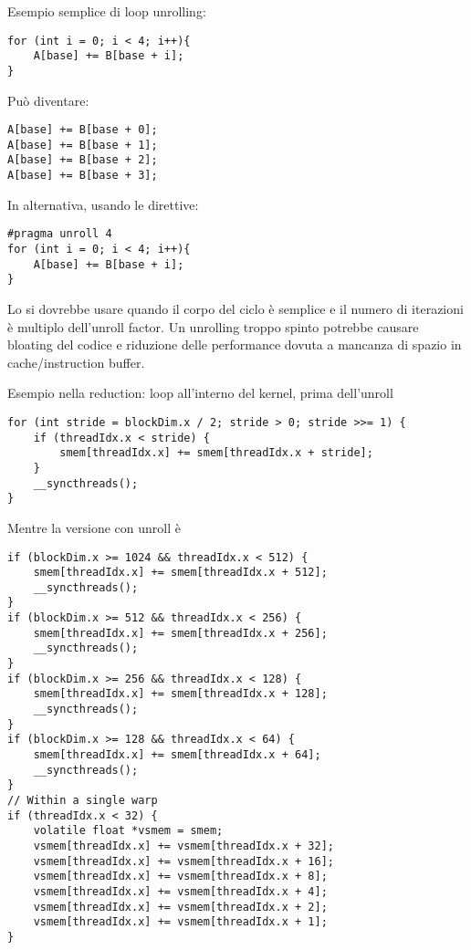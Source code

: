 \begin{questions}
\begin{solution}
        Esempio semplice di loop unrolling: 
        \begin{verbatim}
for (int i = 0; i < 4; i++){
    A[base] += B[base + i];
}
        \end{verbatim}
        Può diventare:
        \begin{verbatim}
A[base] += B[base + 0];
A[base] += B[base + 1];
A[base] += B[base + 2];
A[base] += B[base + 3];
        \end{verbatim}
        
        In alternativa, usando le direttive:
        \begin{verbatim}
#pragma unroll 4
for (int i = 0; i < 4; i++){
    A[base] += B[base + i];
}
        \end{verbatim}
        
        Lo si dovrebbe usare quando il corpo del ciclo è semplice e il numero di iterazioni è multiplo dell'unroll factor. Un unrolling troppo spinto potrebbe causare bloating del codice e riduzione delle performance dovuta a mancanza di spazio in cache/instruction buffer.
        
        Esempio nella reduction: loop all'interno del kernel, prima dell'unroll
        \begin{verbatim}
for (int stride = blockDim.x / 2; stride > 0; stride >>= 1) {
    if (threadIdx.x < stride) {
        smem[threadIdx.x] += smem[threadIdx.x + stride];
    }
    __syncthreads();
}
        \end{verbatim}
        
        Mentre la versione con unroll è
        \begin{verbatim}
if (blockDim.x >= 1024 && threadIdx.x < 512) {
    smem[threadIdx.x] += smem[threadIdx.x + 512];
    __syncthreads();
}
if (blockDim.x >= 512 && threadIdx.x < 256) {
    smem[threadIdx.x] += smem[threadIdx.x + 256];
    __syncthreads();
}
if (blockDim.x >= 256 && threadIdx.x < 128) {
    smem[threadIdx.x] += smem[threadIdx.x + 128];
    __syncthreads();
}
if (blockDim.x >= 128 && threadIdx.x < 64) {
    smem[threadIdx.x] += smem[threadIdx.x + 64];
    __syncthreads();
}
// Within a single warp
if (threadIdx.x < 32) {
    volatile float *vsmem = smem;
    vsmem[threadIdx.x] += vsmem[threadIdx.x + 32];
    vsmem[threadIdx.x] += vsmem[threadIdx.x + 16];
    vsmem[threadIdx.x] += vsmem[threadIdx.x + 8];
    vsmem[threadIdx.x] += vsmem[threadIdx.x + 4];
    vsmem[threadIdx.x] += vsmem[threadIdx.x + 2];
    vsmem[threadIdx.x] += vsmem[threadIdx.x + 1];
}
        \end{verbatim}
    \end{solution}
    

\end{questions}
